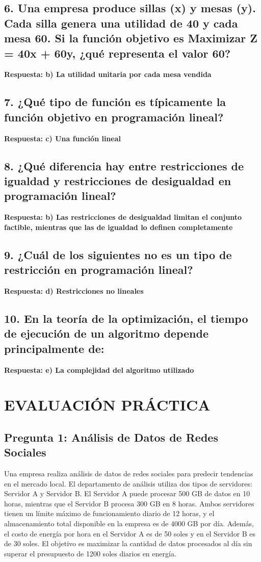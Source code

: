 \documentclass[12pt,a4paper]{article}
\begin{document}
\subsection*{6. Una empresa produce sillas (x) y mesas (y). Cada silla genera una utilidad de 40 y cada mesa 60. Si la función objetivo es Maximizar Z = 40x + 60y, ¿qué representa el valor 60?}
\textbf{Respuesta: b) La utilidad unitaria por cada mesa vendida}


\subsection*{7. ¿Qué tipo de función es típicamente la función objetivo en programación lineal?}
\textbf{Respuesta: c) Una función lineal}

\subsection*{8. ¿Qué diferencia hay entre restricciones de igualdad y restricciones de desigualdad en programación lineal?}
\textbf{Respuesta: b) Las restricciones de desigualdad limitan el conjunto factible, mientras que las de igualdad lo definen completamente}



\subsection*{9. ¿Cuál de los siguientes no es un tipo de restricción en programación lineal?}
\textbf{Respuesta: d) Restricciones no lineales}


\subsection*{10. En la teoría de la optimización, el tiempo de ejecución de un algoritmo depende principalmente de:}
\textbf{Respuesta: e) La complejidad del algoritmo utilizado}

\newpage

\section{EVALUACIÓN PRÁCTICA}

\subsection*{Pregunta 1: Análisis de Datos de Redes Sociales}

Una empresa realiza análisis de datos de redes sociales para predecir tendencias en el mercado local. El departamento de análisis utiliza dos tipos de servidores: Servidor A y Servidor B. El Servidor A puede procesar 500 GB de datos en 10 horas, mientras que el Servidor B procesa 300 GB en 8 horas. Ambos servidores tienen un límite máximo de funcionamiento diario de 12 horas, y el almacenamiento total disponible en la empresa es de 4000 GB por día. Además, el costo de energía por hora en el Servidor A es de 50 soles y en el Servidor B es de 30 soles. El objetivo es maximizar la cantidad de datos procesados al día sin superar el presupuesto de 1200 soles diarios en energía.
\end{document}

